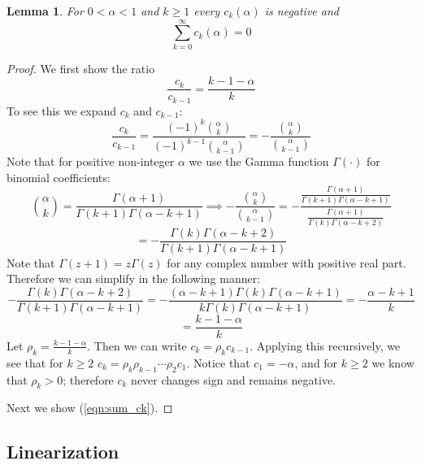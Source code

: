 \documentclass[11pt,a4paper]{article}
\newtheorem{lemma}{Lemma}
\begin{document}
\begin{lemma}
  For $0<\alpha < 1$ and $k\geq 1$ every $c_k(\alpha)$ is negative and
  \begin{equation}
    \label{eqn:sum_ck}
  \sum_{k=0}^{\infty} c_k(\alpha) = 0
  \end{equation}
\end{lemma}
\begin{proof}
  We first show the ratio 
  \[
  \frac{c_k}{c_{k-1}} = \frac{k-1-\alpha}{k}
  \]
  To see this we expand $c_k$ and $c_{k-1}$:
  \[
  \frac{c_k}{c_{k-1}} = \frac{(-1)^k{\alpha\choose k}}{(-1)^{k-1}{\alpha\choose k-1}} = -\frac{{\alpha\choose k}}{{\alpha\choose k-1}}
  \]
  Note that for positive non-integer $\alpha$ we use the Gamma function $\Gamma(\cdot)$ for binomial coefficients:
  \[
  {\alpha\choose k} = \frac{\Gamma(\alpha+1)}{\Gamma(k+1)\Gamma(\alpha - k + 1)} \implies -\frac{{\alpha\choose k}}{{\alpha\choose k-1}} = 
  -\frac{\frac{\Gamma(\alpha+1)}{\Gamma(k+1)\Gamma(\alpha - k + 1)}  }{\frac{\Gamma(\alpha+1)}{\Gamma(k)\Gamma(\alpha - k + 2)}}
  \]
  \[
  = -\frac{\Gamma(k)\Gamma(\alpha-k+2)}{\Gamma(k+1)\Gamma(\alpha-k+1)}
  \]
  Note that $\Gamma(z+1) = z\Gamma(z)$ for any complex number with positive real part. Therefore we can simplify in the following manner:
  \[
  -\frac{\Gamma(k)\Gamma(\alpha-k+2)}{\Gamma(k+1)\Gamma(\alpha-k+1)} = -\frac{(\alpha-k+1)\Gamma(k)\Gamma(\alpha-k+1)}{k\Gamma(k)\Gamma(\alpha-k+1)}
  = -\frac{\alpha - k + 1}{k}
  \]
  \[
  = \frac{k-1-\alpha}{k}
  \]
  Let $\rho_k = \frac{k-1-\alpha}{k}$. Then we can write $c_k = \rho_k c_{k-1}$. Applying this recursively, we see that for $k\geq 2$ $c_k = \rho_k\rho_{k-1}\cdots\rho_2c_1$. Notice that $c_1 = -\alpha$, and for $k\geq 2$ we know that $\rho_k > 0$; therefore $c_k$ never changes sign and remains negative.

  Next we show (\ref{eqn:sum_ck}). 
\end{proof}
\subsection{Linearization}
\label{sec:linearization}
\end{document}
